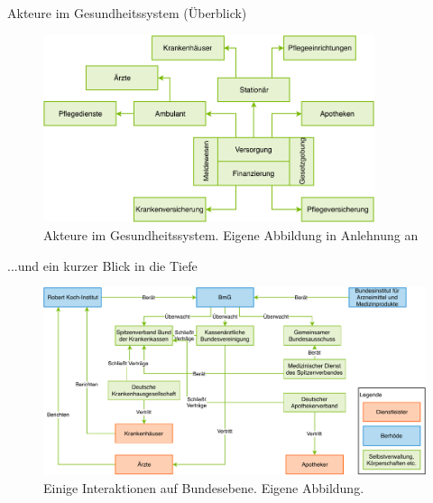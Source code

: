 \begin{frame}{Akteure im Gesundheitssystem (Überblick)}
    \begin{figure}[h!]
        \includegraphics[height=5.5cm]{Bilder/Gesundheitssystem.pdf}
        \caption{Akteure im Gesundheitssystem. Eigene Abbildung in Anlehnung an \cite{SmartHealth}}
    \end{figure}
\end{frame}

\begin{frame}{...und ein kurzer Blick in die Tiefe}
    \begin{figure}[h!]
        \includegraphics[height=5.5cm, right]{Bilder/GesundheitssystemAkteureBund.pdf}
        \caption{Einige Interaktionen auf Bundesebene. Eigene Abbildung.}
    \end{figure}
\end{frame}

